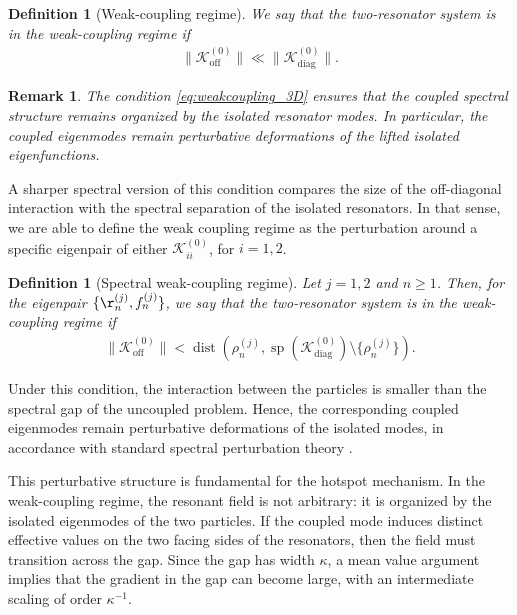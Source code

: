 \documentclass[10pt]{article}
\numberwithin{equation}{section}
\newtheorem*{remark}{Remark}
\newtheorem{definition}[theorem]{Definition}
\begin{document}
\begin{definition}[Weak-coupling regime]
We say that the two-resonator system is in the weak-coupling regime if
\begin{align}\label{eq:weakcoupling_3D}
    \| \mathcal K_{\mathrm{off}}^{(0)} \|
    \ll
    \| \mathcal K_{\mathrm{diag}}^{(0)} \|.
\end{align}
\end{definition}


\begin{remark}
    The condition \eqref{eq:weakcoupling_3D} ensures that the coupled spectral structure remains organized by the isolated resonator modes. In particular, the coupled eigenmodes remain perturbative deformations of the lifted isolated eigenfunctions.
\end{remark}

A sharper spectral version of this condition compares the size of the off-diagonal interaction with the spectral separation of the isolated resonators. In that sense, we are able to define the weak coupling regime as the perturbation around a specific eigenpair of either $\mathcal{K}^{(0)}_{ii}$, for $i=1,2$.

\begin{definition}[Spectral weak-coupling regime]
    Let $j=1,2$ and $n\geq1$. Then, 
    for the eigenpair $\{ \r_n^{(j)}, f_n^{(j)} \}$, we say that the two-resonator system is in the weak-coupling regime if
    \begin{align}\label{eq:spectralgap_3D}
        \| \mathcal K_{\mathrm{off}}^{(0)} \| < \operatorname{dist} \left( \rho_n^{(j)}, \operatorname{sp}(\mathcal K_{\mathrm{diag}}^{(0)}) \setminus \{\rho_n^{(j)}\} \right).
    \end{align}
\end{definition}

Under this condition, the interaction between the particles is smaller than the spectral gap of the uncoupled problem. Hence, the corresponding coupled eigenmodes remain perturbative deformations of the isolated modes, in accordance with standard spectral perturbation theory \cite{Kato}.

This perturbative structure is fundamental for the hotspot mechanism. In the weak-coupling regime, the resonant field is not arbitrary: it is organized by the isolated eigenmodes of the two particles. If the coupled mode induces distinct effective values on the two facing sides of the resonators, then the field must transition across the gap. Since the gap has width $\kappa$, a mean value argument implies that the gradient in the gap can become large, with an intermediate scaling of order $\kappa^{-1}$.
\end{document}
